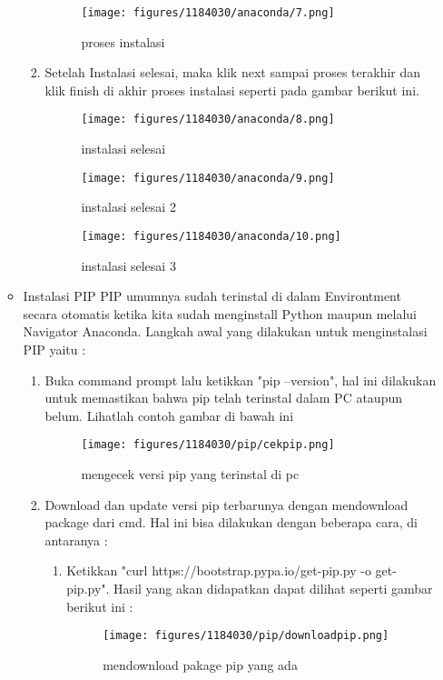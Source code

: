 \begin{enumerate}
\begin{itemize}
\begin{enumerate}
			\begin{figure}[H]
			\texttt{[image: figures/1184030/anaconda/7.png]}
			\centering
			\caption{proses instalasi}
			\end{figure}
		\item Setelah Instalasi selesai, maka klik next sampai proses terakhir dan klik finish di akhir proses instalasi seperti pada gambar berikut ini.\\
			\begin{figure}[H]
			\texttt{[image: figures/1184030/anaconda/8.png]}
			\centering
			\caption{instalasi selesai}
			\end{figure}
			\begin{figure}[H]
			\texttt{[image: figures/1184030/anaconda/9.png]}
			\centering
			\caption{instalasi selesai 2}
			\end{figure}
			\begin{figure}[H]
			\texttt{[image: figures/1184030/anaconda/10.png]}
			\centering
			\caption{instalasi selesai 3}
			\end{figure}
	\end{enumerate}
	\item Instalasi PIP
		PIP umumnya sudah terinstal di dalam Environtment secara otomatis ketika kita sudah menginstall Python maupun melalui Navigator Anaconda. Langkah awal yang dilakukan untuk menginstalasi PIP yaitu :
		\begin{enumerate}
			\item Buka command prompt lalu ketikkan "pip --version", hal ini dilakukan untuk memastikan bahwa pip telah terinstal dalam PC ataupun belum. Lihatlah contoh gambar di bawah ini
				\begin{figure}[H]
				\texttt{[image: figures/1184030/pip/cekpip.png]}
				\centering
				\caption{mengecek versi pip yang terinstal di pc}
				\end{figure}
			\item Download dan update versi pip terbarunya dengan mendownload package dari cmd. Hal ini bisa dilakukan dengan beberapa cara, di antaranya :
			\begin{enumerate}
				\item Ketikkan "curl https://bootstrap.pypa.io/get-pip.py -o get-pip.py". Hasil yang akan didapatkan dapat dilihat seperti gambar berikut ini :
				\begin{figure}[H]
				\texttt{[image: figures/1184030/pip/downloadpip.png]}
				\centering
				\caption{mendownload pakage pip yang ada}

\end{figure}
\end{enumerate}
\end{enumerate}
\end{itemize}
\end{enumerate}

